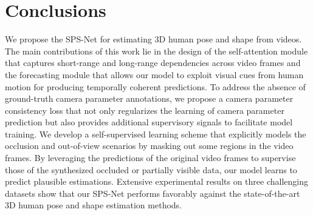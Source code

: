 \documentclass[times,referee,twocolumn,final,authoryear]{elsarticle}
\begin{document}
\vspace{-3.5mm}
\section{Conclusions}

We propose the SPS-Net for estimating 3D human pose and shape from videos.
The main contributions of this work lie in the design of the self-attention module that captures short-range and long-range dependencies across video frames and the forecasting module that allows our model to exploit visual cues from human motion for producing temporally coherent predictions.
To address the absence of ground-truth camera parameter annotations, we propose a camera parameter consistency loss that not only regularizes the learning of camera parameter prediction but also provides additional supervisory signals to facilitate model training.
We develop a self-supervised learning scheme that explicitly models the occlusion and out-of-view scenarios by masking out some regions in the video frames.
By leveraging the predictions of the original video frames to supervise those of the synthesized occluded or partially visible data, our model learns to predict plausible estimations.
Extensive experimental results on three challenging datasets show that our SPS-Net performs favorably against the state-of-the-art 3D human pose and shape estimation methods.



\end{document}
